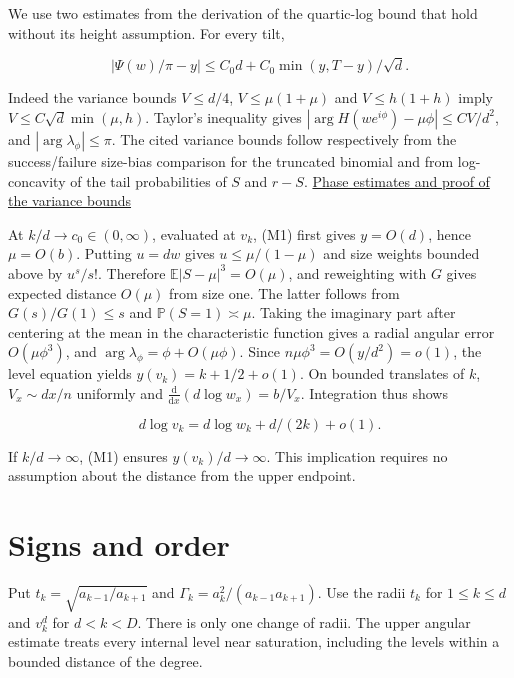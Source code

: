 We use two estimates from the derivation of the quartic-log bound that hold without its height assumption. For every tilt,

\begin{equation}
|\Psi(w)/\pi-y|\le C_0 d+C_0\min(y,T-y)/\sqrt d .
\tag{M1}
\end{equation}

Indeed the variance bounds $V\le d/4$, $V\le\mu(1+\mu)$ and $V\le h(1+h)$ imply $V\le C\sqrt d\min(\mu,h)$. Taylor's inequality gives $|\arg H(we^{i\phi})-\mu\phi|\le C V/d^2$, and $|\arg\lambda_\phi|\le\pi$. The cited variance bounds follow respectively from the success/failure size-bias comparison for the truncated binomial and from log-concavity of the tail probabilities of $S$ and $r-S$. \href{https://github.com/ProgramComputer/open-math-research/blob/04564a728c21eab6ce511b98a48ccaac754648ff/topics/balanced-arrays/very-tall/proof.md}{Phase estimates and proof of the variance bounds}

At $k/d\to c_0\in(0,\infty)$, evaluated at $v_k$, (M1) first gives $y=O(d)$, hence $\mu=O(b)$. Putting $u=dw$ gives $u\le\mu/(1-\mu)$ and size weights bounded above by $u^s/s!$. Therefore $\mathbb E|S-\mu|^3=O(\mu)$, and reweighting with $G$ gives expected distance $O(\mu)$ from size one. The latter follows from $G(s)/G(1)\le s$ and $\mathbb P(S=1)\asymp\mu$. Taking the imaginary part after centering at the mean in the characteristic function gives a radial angular error $O(\mu\phi^3)$, and $\arg\lambda_\phi=\phi+O(\mu\phi)$. Since $n\mu\phi^3=O(y/d^2)=o(1)$, the level equation yields $y(v_k)=k+1/2+o(1)$. On bounded translates of $k$, $V_x\sim dx/n$ uniformly and $\frac{\mathrm d}{\mathrm dx}(d\log w_x)=b/V_x$. Integration thus shows

\begin{equation}
d\log v_k=d\log w_k+d/(2k)+o(1).
\tag{M2}
\end{equation}

If $k/d\to\infty$, (M1) ensures $y(v_k)/d\to\infty$. This implication requires no assumption about the distance from the upper endpoint.

\section{Signs and order}

Put $t_k=\sqrt{a_{k-1}/a_{k+1}}$ and $\Gamma_k=a_k^2/(a_{k-1}a_{k+1})$. Use the radii $t_k$ for $1\le k\le d$ and $v_k^d$ for $d<k<D$. There is only one change of radii. The upper angular estimate treats every internal level near saturation, including the levels within a bounded distance of the degree.

